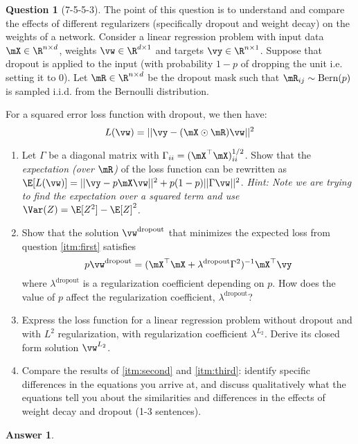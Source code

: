 \documentclass[12pt]{article}
\theoremstyle{definition}
\newtheorem{exercise}{Question}%
\newtheorem{answer}{Answer} %
\newcommand{\Exercise}[1]{
#1
}
\newcommand{\Answer}[1]{
\begin{answer}#1\end{answer}
}
\begin{document}
\begin{exercise}[7-5-5-3]

\Exercise{
\label{ex:dropout_weightdecay} The point of this question is to understand and compare the effects of different regularizers (specifically dropout and weight decay) on the weights of a network.
Consider a linear regression problem with input data $\mX\in\R^{n\times d}$, weights $\vw\in\R^{d\times 1}$ and targets $\vy\in\R^{n\times 1}$. 
Suppose that dropout is applied to the input (with probability $1-p$ of dropping the unit i.e. setting it to 0).
Let $\mR\in\R^{n\times d}$ be the dropout mask such that $\mR_{ij}\sim\textnormal{Bern}(p)$ is sampled i.i.d. from the Bernoulli distribution. 

For a squared error loss function with dropout, we then have:
$$L(\vw)=||\vy-(\mX\odot\mR)\vw||^2$$

\begin{enumerate}[label=\arabic{exercise}.\arabic*]
\item \label{itm:first}
Let $\Gamma$ be a diagonal matrix with $\Gamma_{ii}=(\mX^\top\mX)_{ii}^{1/2}$.
Show that the \textit{expectation (over $\mR$)} of the loss function can be rewritten as $\E[L(\vw)]=||\vy-p\mX\vw||^2+p(1-p)||\Gamma\vw||^2$.
\emph{Hint: Note we are trying to find the expectation over a squared term and use $\Var(Z) = \E[Z^2] - \E[Z]^2 $.}

\item \label{itm:second}
Show that the solution $\vw^{\mathrm{dropout}}$ that minimizes the expected loss from question \ref{itm:first} satisfies
$$p\vw^{\mathrm{dropout}}=(\mX^\top\mX+\lambda^{\mathrm{dropout}}\Gamma^2)^{-1}\mX^\top\vy$$
where $\lambda^{\mathrm{dropout}}$ is a regularization coefficient depending on $p$. 
How does the value of $p$ affect the regularization coefficient, $\lambda^{\mathrm{dropout}}$?

\item \label{itm:third}
Express the loss function for a linear regression problem without dropout and with $L^2$ regularization, with regularization coefficient $\lambda^{L_2}$. Derive its closed form solution $\vw^{L_2}$. 

\item 
Compare the results of \ref{itm:second} and \ref{itm:third}: identify specific differences in the equations you arrive at, and discuss qualitatively what the equations tell you about the similarities and differences in the effects of weight decay and dropout (1-3 sentences).
\end{enumerate}
}

\Answer{

}
\end{exercise}
\end{document}

